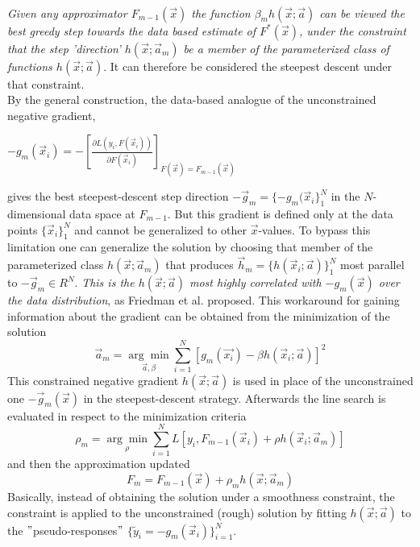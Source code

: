 \documentclass[12pt, a4paper]{article}
\begin{document}
\\
\textit{Given any approximator $F_{m-1}(\vec{x})$ the function $\beta_m h(\vec{x};\vec{a})$ can be viewed the best greedy step towards the data based estimate of $F^{\ast}(\vec{x})$, under the constraint that the step 'direction' $h(\vec{x};\vec{a}_m)$ be a member of the parameterized class of functions $h(\vec{x};\vec{a})$}. It can therefore be considered the steepest descent under that constraint.
\\
By the general construction, the data-based analogue of the unconstrained negative gradient,
\begin{center}
    $
        - g_m(\vec{x}_i) = - [\frac{\partial L(y_i, F(\vec{x}_i))}{\partial F(\vec{x}_i)}]_{F(\vec{x}) = F_{m-1}(\vec{x})}
    $
\end{center}
gives the best steepest-descent step direction $-\vec{g}_m = \{-g_m(\vec{x}_i\}_1^N$ in the $N$-dimensional data space at $F_{m-1}$.
But this gradient is defined only at the data points $\{\vec{x}_i\}_1^N$ and cannot be generalized to other $\vec{x}$-values. 
To bypass this limitation one can generalize the solution by choosing that member of the parameterized class $h(\vec{x};\vec{a}_m)$ that produces $\vec{h}_{m} = \{h(\vec{x}_i ;\vec{a})\}_1^N$ most parallel to $-\vec{g}_m \in R^N$. \textit{This is the $h(\vec{x};\vec{a})$ most highly correlated with $- g_m(\vec{x})$ over the data distribution}, as Friedman et al. \cite{Friedman2001} proposed. This workaround for gaining information about the gradient can be obtained from the minimization of the solution
\begin{equation}
    \vec{a}_m = \underset{ \vec{a}, \beta }{\arg\min} 
    \sum_{i=1}^N [g_{m}(\vec{x_i}) - \beta h(\vec{x}_i;\vec{a})]^2
\end{equation}
This constrained negative gradient $h(\vec{x};\vec{a})$ is used in place of the unconstrained one $-\vec{g}_m(\vec{x})$ in the steepest-descent strategy. Afterwards the line search is evaluated in respect to the minimization criteria
\begin{equation}
        \rho_m = \underset{\rho}{\arg\min} \sum_{i=1}^N L[y_i,F_{m-1}(\vec{x}_i) + \rho h(\vec{x}_i;\vec{a}_m)]
\end{equation}
and then the approximation updated
\begin{equation}
    F_{m} = F_{m-1}(\vec{x}) + \rho_m h(\vec{x};\vec{a}_m)
\end{equation}
Basically, instead of obtaining the solution under a smoothness constraint, the constraint is applied to the unconstrained (rough) solution by fitting $h(\vec{x};\vec{a})$ to the $"$pseudo-responses$"$ $\{\tilde{y}_i = - g_m(\vec{x}_i)\}_{i=1}^N$.
\end{document}
